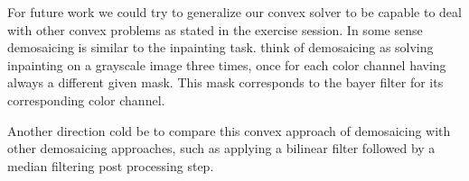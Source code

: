 \documentclass{paper}
\begin{document}
For future work we could try to generalize our convex solver to be capable to deal with other convex problems as stated in the exercise session. In some sense demosaicing is similar to the inpainting task. think of demosaicing as solving inpainting on a grayscale image three times, once for each color channel having always a different given mask. This mask corresponds to the bayer filter for its corresponding color channel. 

Another direction cold be to compare this convex approach of demosaicing with other demosaicing approaches, such as applying a bilinear filter followed by a median filtering post processing step.
\end{document}
